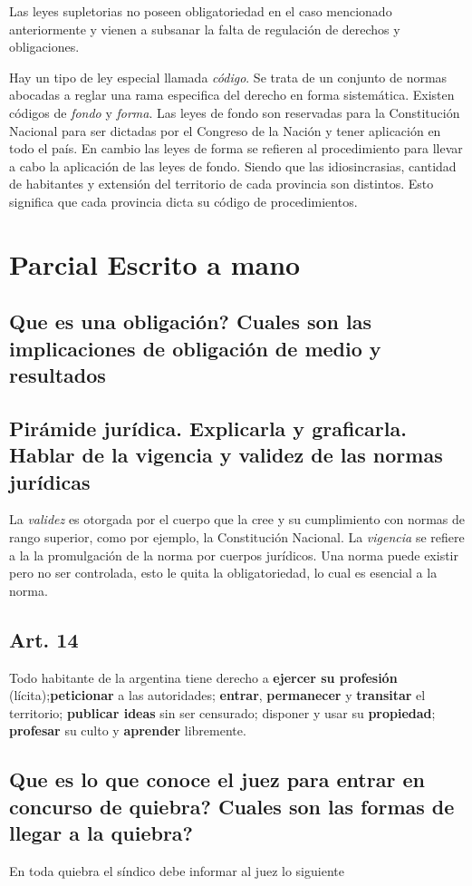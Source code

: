 \documentclass{article}
\begin{document}
Las leyes supletorias no poseen obligatoriedad en el caso mencionado anteriormente y vienen a subsanar la falta de regulación de derechos y obligaciones.

Hay un tipo de ley especial llamada \textit{código}. Se trata de un conjunto de normas abocadas a reglar una rama especifica del derecho en forma sistemática. Existen códigos de \textit{fondo} y \textit{forma}. Las leyes de fondo son reservadas para la Constitución Nacional para ser dictadas por el Congreso de la Nación y tener aplicación en todo el país. En cambio las leyes de forma se refieren al procedimiento para llevar a cabo la aplicación de las leyes de fondo. Siendo que las idiosincrasias, cantidad de habitantes y extensión del territorio de cada provincia son distintos. Esto significa que cada provincia dicta su código de procedimientos.


\section{Parcial Escrito a mano}
\subsection{Que es una obligación? Cuales son las implicaciones de obligación de medio y resultados}

\subsection{Pirámide jurídica. Explicarla y graficarla. Hablar de la vigencia y validez de las normas jurídicas}
La \textit{validez} es otorgada por el cuerpo que la cree y su cumplimiento con normas de rango superior, como por ejemplo, la Constitución Nacional.
La \textit{vigencia} se refiere a la la promulgación de la norma por cuerpos jurídicos. Una norma puede existir pero no ser controlada, esto le quita la obligatoriedad, lo cual es esencial a la norma.
\subsection{Art. 14} \label{sec:Art14}
Todo habitante de la argentina tiene derecho a\textbf{ ejercer su profesión} (lícita);\textbf{peticionar} a las autoridades; \textbf{entrar}, \textbf{permanecer} y \textbf{transitar} el territorio; \textbf{publicar ideas} sin ser censurado; disponer y usar su \textbf{propiedad}; \textbf{profesar} su culto y \textbf{aprender} libremente.
\subsection{Que es lo que conoce el juez para entrar en concurso de quiebra? Cuales son las formas de llegar a la quiebra?}
\label{sec:QueConoceJuezEnConcursoQuiebra}
En toda quiebra el síndico debe informar al juez lo siguiente
\end{document}
